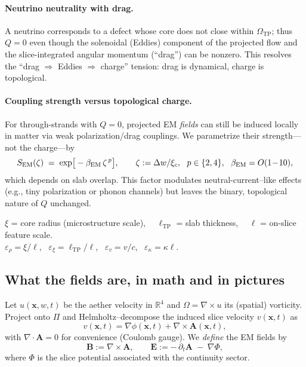 \paragraph{Neutrino neutrality with drag.}
A neutrino corresponds to a defect whose core does not close within $\Omega_{\mathrm{TP}}$; thus $Q=0$ even though the solenoidal (Eddies) component of the projected flow and the slice-integrated angular momentum (``drag'') can be nonzero. This resolves the ``drag $\Rightarrow$ Eddies $\Rightarrow$ charge'' tension: drag is dynamical, charge is topological.

\paragraph{Coupling strength versus topological charge.}
For through-strands with $Q=0$, projected EM \emph{fields} can still be induced locally in matter via weak polarization/drag couplings. We parametrize their strength—not the charge—by
\begin{equation}
\label{eq:SEM}
S_{\rm EM}(\zeta)\;=\;\exp\!\big[-\beta_{\rm EM}\,\zeta^{\,p}\big],\qquad
\zeta:=\Delta w/\xi_c,\ \ p\in\{2,4\},\ \ \beta_{\rm EM}=O(1\!-\!10),
\end{equation}
which depends on slab overlap. This factor modulates neutral-current–like effects (e.g., tiny polarization or phonon channels) but leaves the binary, topological nature of $Q$ unchanged.

\begin{tcolorbox}[title=Scales and small parameters (at a glance)]
$\xi$ = core radius (microstructure scale), \ \
$\ell_{\mathrm{TP}}$ = slab thickness, \ \
$\ell$ = on-slice feature scale.\\
$\varepsilon_\rho=\xi/\ell$, \ $\varepsilon_\xi=\ell_{\mathrm{TP}}/\ell$, \ $\varepsilon_v=v/c$, \ $\varepsilon_\kappa=\kappa\ell$.
\end{tcolorbox}



\subsection{What the fields are, in math and in pictures}
Let $u(\mathbf x,w,t)$ be the aether velocity in $\mathbb{R}^4$ and $\Omega=\nabla\!\times u$ its (spatial) vorticity. Project onto $\Pi$ and Helmholtz–decompose the induced slice velocity $v(\mathbf x,t)$ as
\[
v(\mathbf x,t)=\nabla\phi(\mathbf x,t)+\nabla\times\mathbf A(\mathbf x,t),
\]
with $\nabla\!\cdot\!\mathbf A=0$ for convenience (Coulomb gauge). We \emph{define} the EM fields by
\begin{equation}
\mathbf B := \nabla\times\mathbf A,
\qquad
\mathbf E := -\,\partial_t \mathbf A \;-\; \nabla \Phi,
\label{eq:EM_defs}
\end{equation}
where $\Phi$ is the slice potential associated with the continuity sector.

